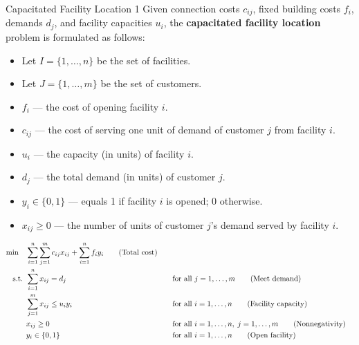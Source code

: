 \begin{general}{Capacitated Facility Location 1}{\npcomplete}
Given connection costs \( c_{ij} \), fixed building costs \( f_i \), demands \( d_j \), and facility capacities \( u_i \), the \textbf{capacitated facility location} problem is formulated as follows:

\begin{itemize}
\item Let \( I = \{1,\dots, n\} \) be the set of facilities.
\item Let \( J = \{1, \dots, m\} \) be the set of customers.
\end{itemize}

\begin{itemize}
\item \( f_i \) — the cost of opening facility \( i \).
\item \( c_{ij} \) — the cost of serving one unit of demand of customer \( j \) from facility \( i \).
\item \( u_i \) — the capacity (in units) of facility \( i \).
\item \( d_j \) — the total demand (in units) of customer \( j \).
\end{itemize}

\begin{itemize}
\item \( y_i \in \{0,1\} \) — equals 1 if facility \( i \) is opened; 0 otherwise.
\item \( x_{ij} \geq 0 \) — the number of units of customer \( j \)'s demand served by facility \( i \).
\end{itemize}

\begin{align}
\min \quad & \sum_{i=1}^n \sum_{j=1}^m c_{ij} x_{ij} + \sum_{i=1}^n f_i y_i   \tag{Total cost} \\
\mbox{ s.t. }        & \sum_{i=1}^n x_{ij} = d_j &&\quad \mbox{for all } j = 1,\dots,m   \tag{Meet demand} \\
& \sum_{j=1}^m x_{ij} \leq u_i y_i &&\quad \mbox{for all } i = 1,\dots,n   \tag{Facility capacity} \\
& x_{ij} \geq 0 &&\quad \mbox{for all } i = 1,\dots,n,\; j = 1,\dots,m   \tag{Nonnegativity} \\
& y_i \in \{0,1\} &&\quad \mbox{for all } i = 1,\dots,n   \tag{Open facility}
\end{align}

\end{general}

